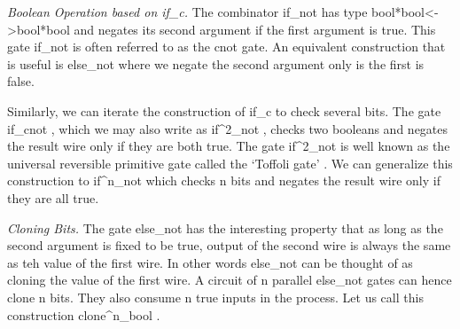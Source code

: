 \documentclass[preprint]{sigplanconf}
\begin{document}
\begin{center}
\end{center}


\emph{Boolean Operation based on {{if_c}}.}
The combinator {{if_{not} }} has type {{bool*bool<->bool*bool}} and
negates its second argument if the first argument is {{true}}. This
gate {{if_{not} }} is often referred to as the {{cnot}} gate. An
equivalent construction that is useful is {{else_{not} }} where we
negate the second argument only is the first is {{false}}. 

Similarly, we can iterate the construction of {{if_c}} to check
several bits. The gate {{if_{cnot} }}, which we may also write as
{{if^2_{not} }}, checks two booleans and negates the result wire only
if they are both {{true}}. The gate {{if^2_{not} }} is well known as
the universal reversible primitive gate called the `Toffoli gate'
\cite{Toffoli:1980}.  We can generalize this construction to
     {{if^n_{not} }} which checks {{n}} bits and negates the result
     wire only if they are all {{true}}.

\emph{Cloning Bits.} The gate {{else_{not} }} has the interesting
property that as long as the second argument is fixed to be {{true}},
output of the second wire is always the same as teh value of the first
wire. In other words {{else_{not} }} can be thought of as cloning the
value of the first wire. A circuit of {{n}} parallel {{else_{not} }}
gates can hence clone {{n}} bits. They also consume {{n}} {{true}}
inputs in the process. Let us call this construction 
{{clone^n_{bool} }}.
\end{document}
